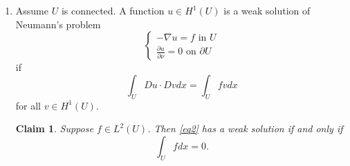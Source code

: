 \documentclass[a4paper]{article}
\newtheorem*{claim}{Claim}
\newcommand{\la}{\left \langle}
\newcommand{\ra}{\right \rangle}
\begin{document}
\begin{enumerate}
\begin{proof}
  Then for any $u,v \in H_0^2(U)$,
  \begin{align*}
    |B[u,v]| &\leq \int_{U}^{} | \Delta u \Delta v| dx \\
    &\leq \|\Delta u\|_{L^2} \|\Delta v\|_{L^2} \quad \parbox{4cm}{by Cauchy-Schwarz} \\
    &= \|D^2 u\|_{L^2} \|D^2 v\|_{L^2} \\
    &\leq \|u\|_{H_0^1} \|v\|_{H_0^1}
  \end{align*}
  Thus we have boundedness of $B$.

  To show coercivity, let $u \in H_0^1(U)$. Then
  \begin{align*}
    B[u,u] &= \|D^2 u\|_{L^2}^2 \\
    &\geq \frac{1}{2} \|D^2 u \|_{L^2}^2 + \frac{C}{2} \|Du\|_{L^2}^2 \quad \parbox{4cm}{by Poincar\a'e's Inequality} \\
    &\geq \frac{1}{2}\|D^2u\|_{L^2}^2 + \frac{C}{4} \|Du\|_{L^2}^2 + \frac{C^2}{2} \|u\|_{L^2}^2 \\
    &\geq A \|u\|_{H_0^2}^2 \quad \parbox{5cm}{where $A = \min \left\{ \frac{1}{2}, \frac{C}{4}, \frac{C^2}{2} \right\} >0$.}
  \end{align*}

  Now we define
  \[ \la f, v \ra = ( f, v )_{L^2} \]
  for any $v \in H_0^2$.
  Then
  \[ | \la f, v \ra | \leq \|f\|_{L^2} \|v\|_{L^2} \leq \|f\|_{L^2} \|v\|_{H_0^2},\]
  so this defines a bounded linear functional on $H_0^2(U)$. By Lax-Milgram, there is a unique $u \in H_0^2$ such that
  \[ B[u,v] = \la f, v \ra \]
  for all $v \in H_0^2(U)$. This translates to
  \[ \int_{U}^{} \Delta u \Delta v dx = \int_{U}^{} fv dx, \]
  which is what we wanted to show.
\end{proof}

\item
  Assume $U$ is connected. A function $u \in H^1(U)$ is a weak solution of Neumann's problem
  \begin{equation}\label{eq2}
    \begin{cases}
      -\nabla u = f \text{ in } U \\
      \frac{\partial u}{\partial \nu} = 0 \text{ on } \partial U
    \end{cases}
  \end{equation}
  if
  \[ \int_{U}^{} Du \cdot Dv dx = \int_{U}^{} fv dx \]
  for all $v \in H^1(U)$.
  \begin{claim}
    Suppose $f \in L^2(U)$. Then \eqref{eq2} has a weak solution if and only if
    \[ \int_{U}^{} f dx = 0.\]
  \end{claim}


\end{enumerate}
\end{document}
